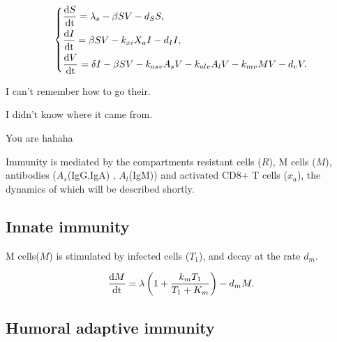\documentclass[preprint,11pt,sort&compress,square]{elsarticle}
\numberwithin{equation}{section}
\begin{document}
\begin{equation}\label{virusdynamics}
	\left\{
	\begin{aligned}
		 & \frac{{\rm d } S}{{\rm dt}}=\lambda_{s}-\beta S V-d_{S}S, \\
		 & \frac{{\rm d } I}{{\rm dt}}=\beta S V-k_{xi}X_{a}I-d_{I}I,                          \\
		 & \frac{{\rm d } V}{{\rm dt}}=\delta I-\beta SV-k_{asv}A_{s}V-k_{alv}A_{l}V-k_{mv}MV-d_{v}V.                          \\
	\end{aligned}
	\right.
\end{equation}

I can’t remember how to go their.

I didn’t know where it came from.

You are hahaha

Immunity is mediated by the compartments resistant cells ($R$), M cells ($M$), antibodies ($A_{s}$(IgG,IgA) , $A_{l}$(IgM)) and activated CD8+ T cells ($x_{a}$), the dynamics of which will be described shortly.

\subsection{Innate immunity}



M cells($M$) is stimulated by infected cells ($T_{1}$), and decay at the rate $d_{m}$.

\begin{equation}\label{innateimmunity}
	\begin{aligned}
		 & \frac{{\rm d } M}{{\rm dt}}=\lambda\left(1+\frac{k_{m}T_{1}}{T_{1}+K_{m}}\right)-d_{m}M.   \\
	\end{aligned}
\end{equation}

\subsection{Humoral adaptive immunity}
\end{document}
